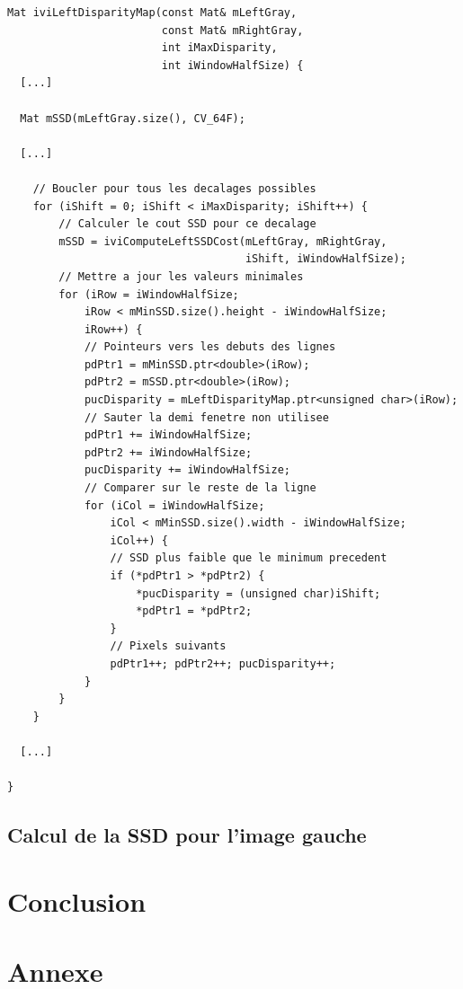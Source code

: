 \documentclass[a4paper]{article}
\begin{document}
\begin{lstlisting}
Mat iviLeftDisparityMap(const Mat& mLeftGray,
                        const Mat& mRightGray,
                        int iMaxDisparity,
                        int iWindowHalfSize) {
  [...]

  Mat mSSD(mLeftGray.size(), CV_64F);

  [...]

    // Boucler pour tous les decalages possibles
    for (iShift = 0; iShift < iMaxDisparity; iShift++) {
        // Calculer le cout SSD pour ce decalage
        mSSD = iviComputeLeftSSDCost(mLeftGray, mRightGray,
                                     iShift, iWindowHalfSize);
        // Mettre a jour les valeurs minimales
        for (iRow = iWindowHalfSize;
            iRow < mMinSSD.size().height - iWindowHalfSize;
            iRow++) {
            // Pointeurs vers les debuts des lignes
            pdPtr1 = mMinSSD.ptr<double>(iRow);
            pdPtr2 = mSSD.ptr<double>(iRow);
            pucDisparity = mLeftDisparityMap.ptr<unsigned char>(iRow);
            // Sauter la demi fenetre non utilisee
            pdPtr1 += iWindowHalfSize;
            pdPtr2 += iWindowHalfSize;
            pucDisparity += iWindowHalfSize;
            // Comparer sur le reste de la ligne
            for (iCol = iWindowHalfSize;
                iCol < mMinSSD.size().width - iWindowHalfSize;
                iCol++) {
                // SSD plus faible que le minimum precedent
                if (*pdPtr1 > *pdPtr2) {
                    *pucDisparity = (unsigned char)iShift;
                    *pdPtr1 = *pdPtr2;
                }
                // Pixels suivants
                pdPtr1++; pdPtr2++; pucDisparity++;
            }
        }
    }

  [...]

}
\end{lstlisting}

\subsection{Calcul de la SSD pour l'image gauche}



\clearpage


\section{Conclusion}

\clearpage

\section{Annexe}
\end{document}
